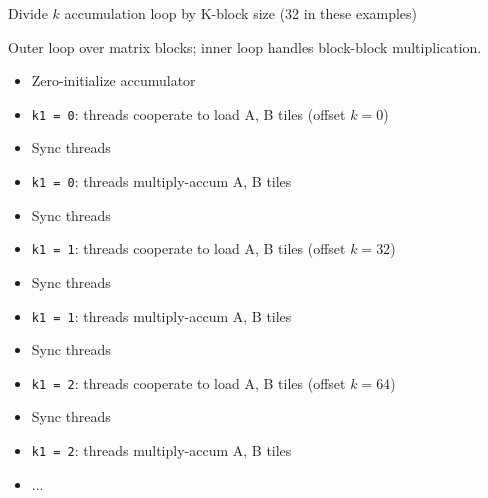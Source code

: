 \newpage
{}

Divide $k$ accumulation loop by K-block size (32 in these examples)

Outer  loop over matrix blocks; inner  loop handles block-block multiplication.

\begin{minipage}[t]{0.48\textwidth}\fixminipage
\begin{itemize}
  \item Zero-initialize accumulator
  \item \texttt{k1 = 0}: threads cooperate to load A, B tiles (offset $k = 0$)
  \item Sync threads
  \item \texttt{k1 = 0}: threads multiply-accum A, B tiles
  \item Sync threads
  \item \texttt{k1 = 1}: threads cooperate to load A, B tiles (offset $k = 32$)
  \item Sync threads
  \item \texttt{k1 = 1}: threads multiply-accum A, B tiles
  \item Sync threads
  \item \texttt{k1 = 2}: threads cooperate to load A, B tiles (offset $k = 64$)
  \item Sync threads
  \item \texttt{k1 = 2}: threads multiply-accum A, B tiles
  \item ...
\end{itemize}
\end{minipage}
\hfill
